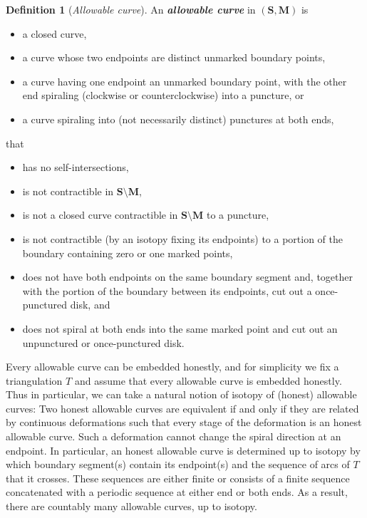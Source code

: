 \documentclass{amsart}
\theoremstyle{definition}
\newtheorem{definition}[proposition]{Definition}
\theoremstyle{remark}
\numberwithin{equation}{section}
\newcommand{\newword}[1]{\textbf{\emph{#1}}}
\newcommand{\0}{{\mathbf{0}}}
\newcommand{\M}{\mathbf{M}}
\renewcommand{\S}{\mathbf{S}}
\begin{document}
\begin{definition}[\emph{Allowable curve}]\label{allowable def}
An \newword{allowable curve} in $(\S,\M)$ is  
\begin{itemize}
\item a closed curve,
\item a curve whose two endpoints are distinct unmarked boundary points,
\item a curve having one endpoint an unmarked boundary point, with the other end spiraling (clockwise or counterclockwise) into a puncture, or
\item a curve spiraling into (not necessarily distinct) punctures at both ends,
\end{itemize}
that
\begin{itemize}
\item has no self-intersections,
\item is not contractible in $\S\setminus\M$,
\item is not a closed curve contractible in $\S\setminus\M$ to a puncture,
\item is not contractible (by an isotopy fixing its endpoints) to a portion of the boundary containing zero or one marked points,
\item does not have both endpoints on the same boundary segment and, together with the portion of the boundary between its endpoints, cut out a once-punctured disk, and 
\item does not spiral at both ends into the same marked point and cut out an unpunctured or once-punctured disk.
\end{itemize}
Every allowable curve can be embedded honestly, and for simplicity we fix a triangulation $T$ and assume that every allowable curve is embedded honestly.  
Thus in particular, we can take a natural notion of isotopy of (honest) allowable curves:
Two honest allowable curves are equivalent if and only if they are related by continuous deformations such that every stage of the deformation is an honest allowable curve.
Such a deformation cannot change the spiral direction at an endpoint.
In particular, an honest allowable curve is determined up to isotopy by which boundary segment(s) contain its endpoint(s) and the sequence of arcs of $T$ that it crosses.
These sequences are either finite or consists of a finite sequence concatenated with a periodic sequence at either end or both ends. 
As a result, there are countably many allowable curves, up to isotopy.
\end{definition}
\end{document}
